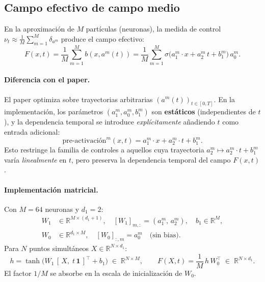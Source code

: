 \documentclass[11pt, a4paper]{article}
\theoremstyle{definition}
\newcommand{\R}{\mathbb{R}}
\begin{document}
\subsection{Campo efectivo de campo medio}
\label{sec:campo_efectivo}

En la aproximación de $M$ partículas (neuronas), la medida de control
$\nu_t \approx \frac{1}{M}\sum_{m=1}^M \delta_{a^m}$ produce el campo
efectivo:
\begin{equation}
  \label{eq:campo}
  F(x, t) = \frac{1}{M}\sum_{m=1}^{M} b(x, a^m(t))
  = \frac{1}{M}\sum_{m=1}^{M}
    \sigma\!\bigl(a_1^m \cdot x + a_2^m\, t + b_1^m\bigr)\, a_0^m.
\end{equation}

\paragraph{Diferencia con el paper.}
El paper optimiza sobre trayectorias arbitrarias $(a^m(t))_{t \in [0,T]}$.
En la implementación, los parámetros $(a_1^m, a_0^m, b_1^m)$ son
\textbf{estáticos} (independientes de $t$), y la dependencia temporal se
introduce \emph{explícitamente} añadiendo $t$ como entrada adicional:
\begin{equation}
  \text{pre-activación}^m(x,t) = a_1^m \cdot x + a_2^m \cdot t + b_1^m.
\end{equation}
Esto restringe la familia de controles a aquellos cuya trayectoria
$a_2^m \mapsto a_2^m \cdot t + b_1^m$ varía \emph{linealmente} en $t$,
pero preserva la dependencia temporal del campo $F(x,t)$.

\paragraph{Implementación matricial.}
Con $M=64$ neuronas y $d_1=2$:
\begin{align}
  W_1 &\in \R^{M \times (d_1+1)}, \quad
    [W_1]_{m,:} = (a_1^m,\, a_2^m), \quad
    b_1 \in \R^M, \\
  W_0 &\in \R^{d_1 \times M}, \quad
    [W_0]_{:,m} = a_0^m \quad \text{(sin bias)}.
\end{align}
Para $N$ puntos simultáneos $X \in \R^{N \times d_1}$:
\begin{equation}
  h = \tanh\!\bigl( W_1\, [\,X,\; t\,\mathbf{1}\,]^\top + b_1\bigr)
  \;\in\; \R^{N \times M},
  \qquad
  F(X, t) = \frac{1}{M}\, h\, W_0^\top \;\in\; \R^{N \times d_1}.
\end{equation}
El factor $1/M$ se absorbe en la escala de inicialización de $W_0$.
\end{document}
